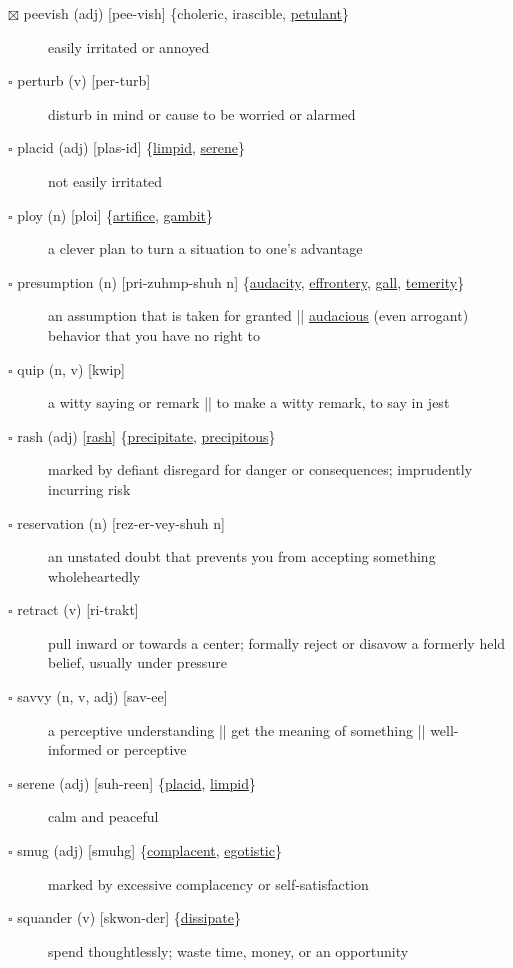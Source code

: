 \documentclass[11pt]{article}
\begin{document}
\begin{description}
\item[{$\boxtimes$ peevish (adj) [pee-vish] \{choleric, irascible, \hyperref[org344341c]{petulant}\}}] easily irritated or annoyed
\item[{$\square$ \label{orgd8eddee} \label{orgb6510fc}perturb (v) [per-turb]}] disturb in mind or cause to be worried or alarmed
\item[{$\square$ \label{org862d885}placid (adj) [plas-id] \{\hyperref[org0ca8cae]{limpid}, \hyperref[org8b7a1bf]{serene}\}}] not easily irritated
\item[{$\square$ \label{orgb05b474}ploy (n) [ploi] \{\hyperref[org79f386c]{artifice}, \hyperref[org6115101]{gambit}\}}] a clever plan to turn a situation to one's advantage
\item[{$\square$ \label{org8e41497}presumption (n) [pri-zuhmp-shuh n] \{\hyperref[org67e3069]{audacity}, \hyperref[orgfd36353]{effrontery}, \hyperref[orge1299c1]{gall}, \hyperref[org0f0706a]{temerity}\}}] an assumption that is taken for granted || \hyperref[org075f98a]{audacious} (even arrogant) behavior that you have no right to
\item[{$\square$ quip (n, v) [kwip]}] a witty saying or remark || to make a witty remark, to say in jest
\item[{$\square$ \label{orgdaf3ff6}rash (adj) [\hyperref[orgdaf3ff6]{rash}] \{\hyperref[orgb014b69]{precipitate}, \hyperref[orgf789f07]{precipitous}\}}] marked by defiant disregard for danger or consequences; imprudently incurring risk
\item[{$\square$ reservation (n) [rez-er-vey-shuh n]}] an unstated doubt that prevents you from accepting something wholeheartedly
\item[{$\square$ retract (v) [ri-trakt]}] pull inward or towards a center; formally reject or disavow a formerly held belief, usually under pressure
\item[{$\square$ savvy (n, v, adj) [sav-ee]}] a perceptive understanding || get the meaning of something || well-informed or perceptive
\item[{$\square$ \label{org8b7a1bf}serene (adj) [suh-reen] \{\hyperref[org862d885]{placid}, \hyperref[org0ca8cae]{limpid}\}}] calm and peaceful
\item[{$\square$ \label{org1873ccf}smug (adj) [smuhg] \{\hyperref[orgaa8a0db]{complacent}, \hyperref[orge21faa1]{egotistic}\}}] marked by excessive complacency or self-satisfaction
\item[{$\square$ \label{org5668651} \label{org95bc096}squander (v) [skwon-der] \{\hyperref[org2995d4d]{dissipate}\}}] spend thoughtlessly; waste time, money, or an opportunity

\end{description}
\end{document}
